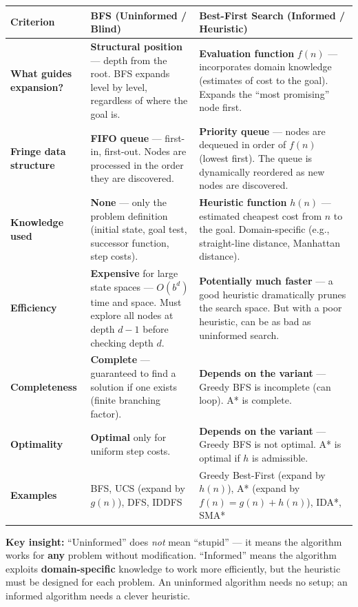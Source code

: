 \documentclass[12pt, a4paper]{article}
\newenvironment{notesbox}{\begin{mdframed}[style=notesframe]}{\end{mdframed}}
\begin{document}
\begin{center}
\renewcommand{\arraystretch}{1.5}
\begin{tabular}{p{4cm}|p{6cm}|p{6cm}}
\toprule
\textbf{Criterion} & \textbf{BFS (Uninformed / Blind)} & \textbf{Best-First Search (Informed / Heuristic)} \\
\midrule
\textbf{What guides expansion?} &
  \textbf{Structural position} — depth from the root. BFS expands level by level, regardless of where the goal is. &
  \textbf{Evaluation function} $f(n)$ — incorporates domain knowledge (estimates of cost to the goal). Expands the ``most promising'' node first. \\
\midrule
\textbf{Fringe data structure} &
  \textbf{FIFO queue} — first-in, first-out. Nodes are processed in the order they are discovered. &
  \textbf{Priority queue} — nodes are dequeued in order of $f(n)$ (lowest first). The queue is dynamically reordered as new nodes are discovered. \\
\midrule
\textbf{Knowledge used} &
  \textbf{None} — only the problem definition (initial state, goal test, successor function, step costs). &
  \textbf{Heuristic function} $h(n)$ — estimated cheapest cost from $n$ to the goal. Domain-specific (e.g., straight-line distance, Manhattan distance). \\
\midrule
\textbf{Efficiency} &
  \textbf{Expensive} for large state spaces — $O(b^d)$ time and space. Must explore all nodes at depth $d{-}1$ before checking depth $d$. &
  \textbf{Potentially much faster} — a good heuristic dramatically prunes the search space. But with a poor heuristic, can be as bad as uninformed search. \\
\midrule
\textbf{Completeness} &
  \textbf{Complete} — guaranteed to find a solution if one exists (finite branching factor). &
  \textbf{Depends on the variant} — Greedy BFS is incomplete (can loop). A* is complete. \\
\midrule
\textbf{Optimality} &
  \textbf{Optimal} only for uniform step costs. &
  \textbf{Depends on the variant} — Greedy BFS is not optimal. A* is optimal if $h$ is admissible. \\
\midrule
\textbf{Examples} &
  BFS, UCS (expand by $g(n)$), DFS, IDDFS &
  Greedy Best-First (expand by $h(n)$), A* (expand by $f(n)=g(n)+h(n)$), IDA*, SMA* \\
\bottomrule
\end{tabular}
\end{center}

\begin{notesbox}
\textbf{Key insight:} ``Uninformed'' does \emph{not} mean ``stupid'' — it means the algorithm works for \textbf{any} problem without modification. ``Informed'' means the algorithm exploits \textbf{domain-specific} knowledge to work more efficiently, but the heuristic must be designed for each problem. An uninformed algorithm needs no setup; an informed algorithm needs a clever heuristic.
\end{notesbox}
\end{document}
